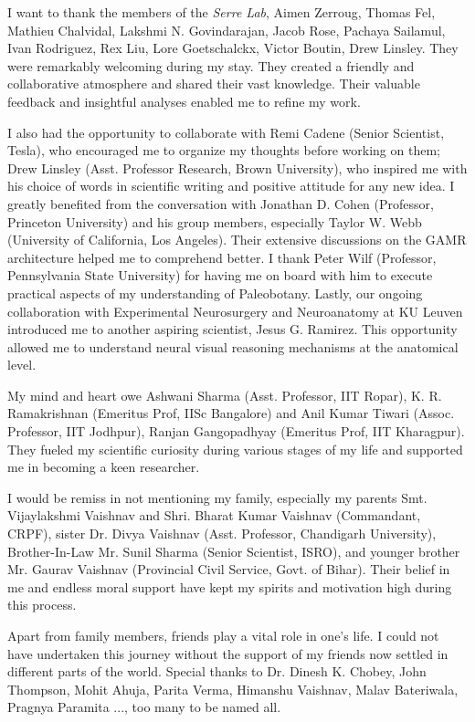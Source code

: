 I want to thank the members of the \textit{Serre Lab}, Aimen Zerroug, Thomas Fel, Mathieu Chalvidal, Lakshmi N. Govindarajan, Jacob Rose, Pachaya Sailamul, Ivan Rodriguez, Rex Liu, Lore Goetschalckx, Victor Boutin, Drew Linsley. They were remarkably welcoming during my stay. They created a friendly and collaborative atmosphere and shared their vast knowledge. Their valuable feedback and insightful analyses enabled me to refine my work. 

I  also had the opportunity to collaborate with Remi Cadene (Senior Scientist, Tesla), who encouraged me to organize my thoughts before working on them; Drew Linsley (Asst. Professor Research, Brown University), who inspired me with his choice of words in scientific writing and positive attitude for any new idea. I greatly benefited from the conversation with Jonathan D. Cohen (Professor, Princeton University) and his group members, especially Taylor W. Webb (University of California, Los Angeles). Their extensive discussions on the GAMR architecture helped me to comprehend better. I thank Peter Wilf (Professor, Pennsylvania State University) for having me on board with him to execute practical aspects of my understanding of Paleobotany. Lastly, our ongoing collaboration with Experimental Neurosurgery and Neuroanatomy at KU Leuven introduced me to another aspiring scientist, Jesus G. Ramirez. This opportunity allowed me to understand neural visual reasoning mechanisms at the anatomical level.

My mind and heart owe Ashwani Sharma (Asst. Professor, IIT Ropar), K. R. Ramakrishnan (Emeritus Prof, IISc Bangalore) and Anil Kumar Tiwari (Assoc. Professor, IIT Jodhpur), Ranjan Gangopadhyay (Emeritus Prof, IIT Kharagpur). They fueled my scientific curiosity during various stages of my life and supported me in becoming a keen researcher.

I would be remiss in not mentioning my family, especially my parents Smt. Vijaylakshmi Vaishnav and Shri. Bharat Kumar Vaishnav (Commandant, CRPF), sister Dr. Divya Vaishnav (Asst. Professor, Chandigarh University), Brother-In-Law Mr. Sunil Sharma (Senior Scientist, ISRO), and younger brother Mr. Gaurav Vaishnav (Provincial Civil Service, Govt. of Bihar). Their belief in me and endless moral support have kept my spirits and motivation high during this process.

Apart from family members, friends play a vital role in one's life. I could not have undertaken this journey without the support of my friends now settled in different parts of the world. Special thanks to Dr. Dinesh K. Chobey, John Thompson, Mohit Ahuja, Parita Verma, Himanshu Vaishnav, Malav Bateriwala, Pragnya Paramita ..., too many to be named all. 
